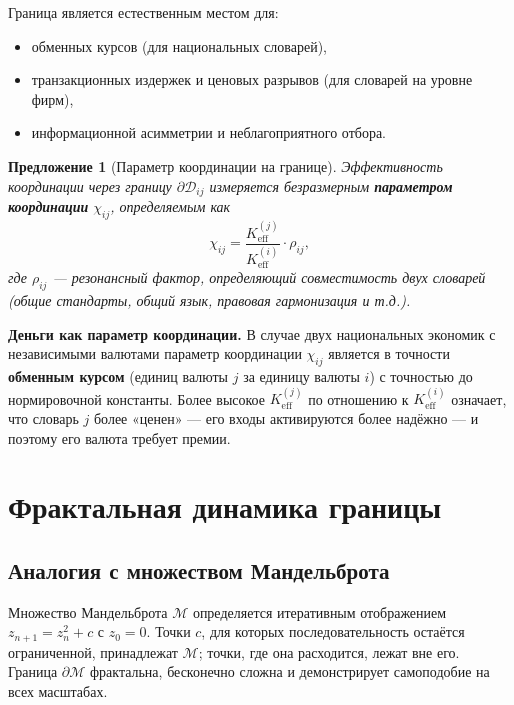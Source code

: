 \documentclass[12pt,a4paper]{article}
\newtheorem{proposition}[theorem]{Предложение}
\theoremstyle{remark}
\begin{document}
	Граница является естественным местом для:
	\begin{itemize}
		\item обменных курсов (для национальных словарей),
		\item транзакционных издержек и ценовых разрывов (для словарей на уровне фирм),
		\item информационной асимметрии и неблагоприятного отбора.
	\end{itemize}
	
	\begin{proposition}[Параметр координации на границе]
		Эффективность координации через границу \(\partial\mathcal{D}_{ij}\) измеряется безразмерным \textbf{параметром координации} \(\chi_{ij}\), определяемым как
		\begin{equation}
			\chi_{ij} = \frac{K_{\mathrm{eff}}^{(j)}}{K_{\mathrm{eff}}^{(i)}} \cdot \rho_{ij},
			\label{eq:chi}
		\end{equation}
		где \(\rho_{ij}\) — резонансный фактор, определяющий совместимость двух словарей (общие стандарты, общий язык, правовая гармонизация и т.д.).
	\end{proposition}
	
	\textbf{Деньги как параметр координации.} В случае двух национальных экономик с независимыми валютами параметр координации \(\chi_{ij}\) является в точности \textbf{обменным курсом} (единиц валюты \(j\) за единицу валюты \(i\)) с точностью до нормировочной константы. Более высокое \(K_{\mathrm{eff}}^{(j)}\) по отношению к \(K_{\mathrm{eff}}^{(i)}\) означает, что словарь \(j\) более «ценен» — его входы активируются более надёжно — и поэтому его валюта требует премии.
	
	\section{Фрактальная динамика границы}
	
	\subsection{Аналогия с множеством Мандельброта}
	
	Множество Мандельброта \(\mathcal{M}\) определяется итеративным отображением \(z_{n+1} = z_n^2 + c\) с \(z_0 = 0\). Точки \(c\), для которых последовательность остаётся ограниченной, принадлежат \(\mathcal{M}\); точки, где она расходится, лежат вне его. Граница \(\partial\mathcal{M}\) фрактальна, бесконечно сложна и демонстрирует самоподобие на всех масштабах.
	
\end{document}
